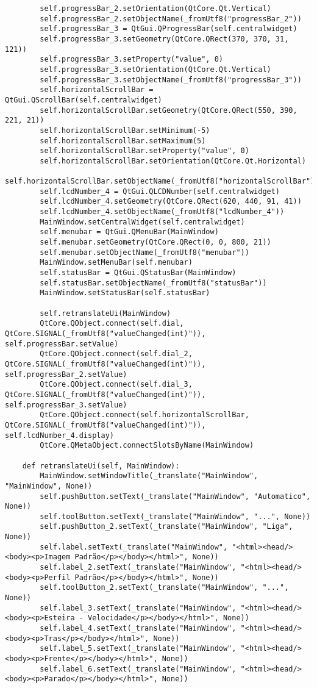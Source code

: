 \begin{lstlisting}
        self.progressBar_2.setOrientation(QtCore.Qt.Vertical)
        self.progressBar_2.setObjectName(_fromUtf8("progressBar_2"))
        self.progressBar_3 = QtGui.QProgressBar(self.centralwidget)
        self.progressBar_3.setGeometry(QtCore.QRect(370, 370, 31, 121))
        self.progressBar_3.setProperty("value", 0)
        self.progressBar_3.setOrientation(QtCore.Qt.Vertical)
        self.progressBar_3.setObjectName(_fromUtf8("progressBar_3"))
        self.horizontalScrollBar = QtGui.QScrollBar(self.centralwidget)
        self.horizontalScrollBar.setGeometry(QtCore.QRect(550, 390, 221, 21))
        self.horizontalScrollBar.setMinimum(-5)
        self.horizontalScrollBar.setMaximum(5)
        self.horizontalScrollBar.setProperty("value", 0)
        self.horizontalScrollBar.setOrientation(QtCore.Qt.Horizontal)
        self.horizontalScrollBar.setObjectName(_fromUtf8("horizontalScrollBar"))
        self.lcdNumber_4 = QtGui.QLCDNumber(self.centralwidget)
        self.lcdNumber_4.setGeometry(QtCore.QRect(620, 440, 91, 41))
        self.lcdNumber_4.setObjectName(_fromUtf8("lcdNumber_4"))
        MainWindow.setCentralWidget(self.centralwidget)
        self.menubar = QtGui.QMenuBar(MainWindow)
        self.menubar.setGeometry(QtCore.QRect(0, 0, 800, 21))
        self.menubar.setObjectName(_fromUtf8("menubar"))
        MainWindow.setMenuBar(self.menubar)
        self.statusBar = QtGui.QStatusBar(MainWindow)
        self.statusBar.setObjectName(_fromUtf8("statusBar"))
        MainWindow.setStatusBar(self.statusBar)

        self.retranslateUi(MainWindow)
        QtCore.QObject.connect(self.dial, QtCore.SIGNAL(_fromUtf8("valueChanged(int)")), self.progressBar.setValue)
        QtCore.QObject.connect(self.dial_2, QtCore.SIGNAL(_fromUtf8("valueChanged(int)")), self.progressBar_2.setValue)
        QtCore.QObject.connect(self.dial_3, QtCore.SIGNAL(_fromUtf8("valueChanged(int)")), self.progressBar_3.setValue)
        QtCore.QObject.connect(self.horizontalScrollBar, QtCore.SIGNAL(_fromUtf8("valueChanged(int)")), self.lcdNumber_4.display)
        QtCore.QMetaObject.connectSlotsByName(MainWindow)

    def retranslateUi(self, MainWindow):
        MainWindow.setWindowTitle(_translate("MainWindow", "MainWindow", None))
        self.pushButton.setText(_translate("MainWindow", "Automatico", None))
        self.toolButton.setText(_translate("MainWindow", "...", None))
        self.pushButton_2.setText(_translate("MainWindow", "Liga", None))
        self.label.setText(_translate("MainWindow", "<html><head/><body><p>Imagem Padrão</p></body></html>", None))
        self.label_2.setText(_translate("MainWindow", "<html><head/><body><p>Perfil Padrão</p></body></html>", None))
        self.toolButton_2.setText(_translate("MainWindow", "...", None))
        self.label_3.setText(_translate("MainWindow", "<html><head/><body><p>Esteira - Velocidade</p></body></html>", None))
        self.label_4.setText(_translate("MainWindow", "<html><head/><body><p>Tras</p></body></html>", None))
        self.label_5.setText(_translate("MainWindow", "<html><head/><body><p>Frente</p></body></html>", None))
        self.label_6.setText(_translate("MainWindow", "<html><head/><body><p>Parado</p></body></html>", None))


\end{lstlisting}
